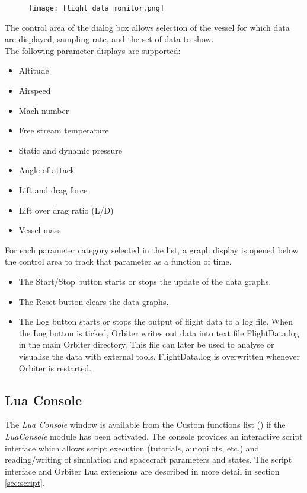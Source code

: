\documentclass[Orbiter User Manual.tex]{subfiles}
\begin{document}
\begin{figure}[H]
	\centering
	\texttt{[image: flight\_data\_monitor.png]}
\end{figure}

\noindent
The control area of the dialog box allows selection of the vessel for which data are displayed, sampling rate, and the set of data to show.\\
The following parameter displays are supported:

\begin{itemize}
\item Altitude
\item Airspeed
\item Mach number
\item Free stream temperature
\item Static and dynamic pressure
\item Angle of attack
\item Lift and drag force
\item Lift over drag ratio (L/D)
\item Vessel mass
\end{itemize}

\noindent
For each parameter category selected in the list, a graph display is opened below the control area to track that parameter as a function of time.

\begin{itemize}
\item The Start/Stop button starts or stops the update of the data graphs.
\item The Reset button clears the data graphs.
\item The Log button starts or stops the output of flight data to a log file. When the Log button is ticked, Orbiter writes out data into text file FlightData.log in the main Orbiter directory. This file can later be used to analyse or visualise the data with external tools. FlightData.log is overwritten whenever Orbiter is restarted.
\end{itemize}


\subsection{Lua Console}
\label{ssec:lua_console}
The \textit{Lua Console} window is available from the Custom functions list (\Ctrl{}) if the \textit{LuaConsole} module has been activated. The console provides an interactive script interface which allows script execution (tutorials, autopilots, etc.) and reading/writing of simulation and spacecraft parameters and states. The script interface and Orbiter Lua extensions are described in more detail in section \ref{sec:script}.
\end{document}
